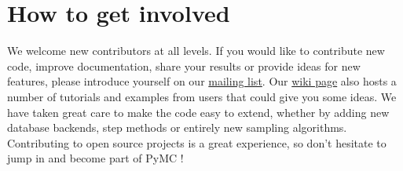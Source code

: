 \section{How to get involved} %

We welcome new contributors at all levels. If you would like to contribute new code, improve documentation, share your results or provide ideas for new features, please introduce yourself on our \href{pymc@googlegroups.com}{mailing list}. Our \href{http://code.google.com/p/pymc/w/list}{wiki page} also hosts a number of tutorials and examples from users that could give you some ideas. We have taken great care to make the code easy to extend, whether by adding new database backends, step methods or entirely new sampling algorithms. Contributing to open source projects is a great experience, so don't hesitate to jump in and become part of PyMC !   


